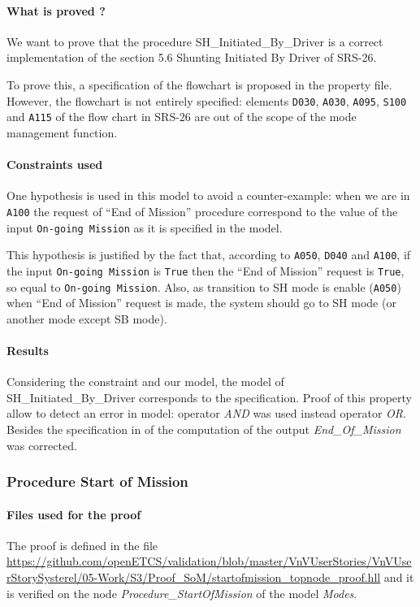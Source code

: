 \paragraph{What is proved ?}
We want to prove that the procedure SH\_Initiated\_By\_Driver is a
correct implementation of the section 5.6 Shunting Initiated By Driver of SRS-26.

To prove this, a specification of the flowchart is proposed in the
property file. However, the flowchart is not entirely specified:
elements \texttt{D030}, \texttt{A030}, \texttt{A095}, \texttt{S100} and
\texttt{A115} of the flow chart in SRS-26 are out of the scope of the mode management function.

\paragraph{Constraints used}
One hypothesis is used in this model to avoid a counter-example: when we are in \texttt{A100} the request of ``End of
Mission'' procedure correspond to the value of the input
\texttt{On-going Mission} as it is specified in the \SCADE{} model.

This hypothesis is justified by the fact that, according to
\texttt{A050}, \texttt{D040} and \texttt{A100}, if the input
\texttt{On-going Mission} is \texttt{True} then the ``End of Mission''
request is \texttt{True}, so equal to \texttt{On-going Mission}. Also,
as transition to SH mode is enable (\texttt{A050}) when ``End of
Mission'' request is made, the system should go to SH mode (or another
mode except SB mode). 

\paragraph{Results}
Considering the constraint and our model, the \SCADE{} model of
SH\_Initiated\_By\_Driver corresponds to the specification. Proof of this property allow to detect an error in \SCADE{} model: operator \emph{AND} was used instead operator \emph{OR}.
Besides the specification in \SCADE{}  of the computation of the output \emph{End\_Of\_Mission} was corrected.

\subsubsection{Procedure Start of Mission}

\paragraph{Files used for the proof}
The proof is defined in the file \url{https://github.com/openETCS/validation/blob/master/VnVUserStories/VnVUserStorySysterel/05-Work/S3/Proof_SoM/startofmission_topnode_proof.hll} and it is verified on the node \emph{Procedure\_StartOfMission} of the \SCADE{} model \emph{Modes}.


